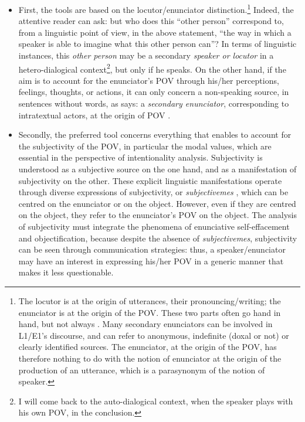 \documentclass[output=paper]{langscibook}
\begin{document}
\begin{itemize}
\begin{itemize}

\item First, the tools are based on the locutor/enunciator distinction.\footnote{The locutor is at the origin of utterances, their pronouncing/writing; the enunciator is at the origin of the POV. These two parts often go hand in hand, but not always \citep{Rabatel2009}. Many secondary enunciators can be involved in L1/E1's discourse, and can refer to anonymous, indefinite (doxal or not) or clearly identified sources. The enunciator, at the origin of the POV, has therefore nothing to do with the notion of enunciator at the origin of the production of an utterance, which is a parasynonym of the notion of speaker.} Indeed, the attentive reader can ask: but who does this “other person” correspond to, from a linguistic point of view, in the above statement, “the way in which a speaker is able to imagine what this other person can”? In terms of linguistic instances, this \textit{other person} may be a secondary \textit{speaker or locutor} in a hetero-dialogical context\footnote{I will come back to the auto-dialogical context, when the speaker plays with his own POV, in the conclusion.}, but only if he speaks. On the other hand, if the aim is to account for the enunciator’s POV through his/her perceptions, feelings, thoughts, or actions, it can only concern a non-speaking source, in{\textmd{ \textup{sentences without words, as \citet{Banfield1995} says}}}: a \textit{secondary enunciator}, corresponding to intratextual actors, at the origin of POV \citep{Ducrot1984}. 

\item Secondly, the preferred tool concerns everything that enables to account for the subjectivity of the POV, in particular the modal values, which are essential in the perspective of intentionality analysis. Subjectivity is understood as a subjective source on the one hand, and as a manifestation of subjectivity on the other. These explicit linguistic manifestations operate through diverse expressions of subjectivity, or \textit{subjectivemes} \citep{Kerbrat-Orecchioni1980}, which can be centred on the enunciator or on the object. However, even if they are centred on the object, they refer to the enunciator's POV on the object. The analysis of subjectivity must integrate the phenomena of enunciative self-effacement and objectification, because despite the absence of \textit{subjectivemes}, subjectivity can be seen through communication strategies: thus, a speaker/enunciator may have an interest in expressing his/her POV in a generic manner that makes it less questionable.

\end{itemize}

\end{itemize}
\end{document}
